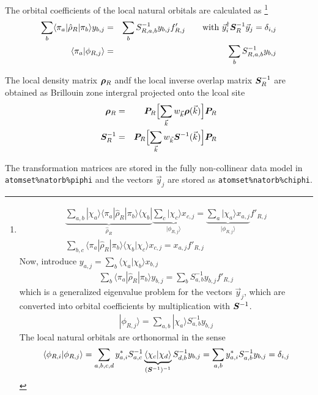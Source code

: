 \documentclass[11pt,a4paper]{report}
\begin{document}
\begin{enumerate}
The orbital coefficients of the local natural orbitals are calculated as
\footnote{
\begin{eqnarray}
\underbrace{\sum_{a,b}|\chi_a\rangle\langle\pi_a|\hat{\rho}_R|\pi_b\rangle
\langle\chi_b|}_{\hat{\rho}_R}
\underbrace{\sum_c|\chi_c\rangle x_{c,j}}_{|\phi_{R,j}\rangle}
=\underbrace{\sum_a|\chi_a\rangle x_{a,j}}_{|\phi_{R,j}\rangle} f'_{R,j}
\nonumber\\
\sum_{b,c}\langle\pi_a|\hat{\rho}_R|\pi_b\rangle
\langle\chi_b|\chi_c\rangle x_{c,j}
=x_{a,j}f'_{R,j}
\end{eqnarray}
Now, introduce $y_{a,j}=\sum_b\langle\chi_a|\chi_b\rangle x_{b,j}$
\begin{eqnarray}
\sum_{b}\langle\pi_a|\hat{\rho}_R|\pi_b\rangle y_{b,j}
=\sum_b S^{-1}_{a,b}y_{b,j}f'_{R,j}
\end{eqnarray}
which is a generalized eigenvalue problem for the vectors $\vec{y}_j$,
which are converted into orbital coefficients by multiplication with
$\bm{S}^{-1}$.
\begin{eqnarray}
|\phi_{R,j}\rangle=\sum_{a,b}|\chi_a\rangle S^{-1}_{a,b} y_{b,j}
\end{eqnarray}
The local natural orbitals are orthonormal in the sense
\begin{eqnarray}
\langle\phi_{R,i}|\phi_{R,j}\rangle
=\sum_{a,b,c,d}
y^*_{a,i}S^{-1}_{a,c}
\underbrace{\langle\chi_c|\chi_d\rangle}_{(\bm{S}^{-1})^{-1}}
 S^{-1}_{d,b} y_{b,j}
=\sum_{a,b}y^*_{a,i}S^{-1}_{a,b}y_{b,j}=\delta_{i,j}
\end{eqnarray}
}
\begin{eqnarray}
\sum_{b}\langle\pi_a|\hat{\rho}_R|\pi_b\rangle y_{b,j}
&=&\sum_b S^{-1}_{R,a,b}y_{b,j}f'_{R,j}
\qquad\text{with $\vec{y}^\dagger_i \bm{S}^{-1}_R\vec{y}_{j}=\delta_{i,j}$}
\\
\langle\pi_a|\phi_{R,j}\rangle&=&\sum_{b} S^{-1}_{R,a,b} y_{b,j}
\end{eqnarray}

The local density matrix $\bm{\rho}_R$ andf the local inverse overlap
matrix $\bm{S}^{-1}_R$ are obtained as Brillouin zone intergral
projected onto the lcoal site
\begin{eqnarray}
\bm{\rho}_R&=&\bm{P}_R\Bigl[
\sum_{\vec{k}} w_{\vec{k}}\bm{\rho}(\vec{k})
\Bigr]\bm{P}_R
\nonumber\\
\bm{S}^{-1}_R&=&\bm{P}_R\Bigl[
\sum_{\vec{k}} w_{\vec{k}}\bm{S}^{-1}(\vec{k})
\Bigr]\bm{P}_R
\end{eqnarray}

The transformation matrices are stored in the fully non-collinear data
model in \verb|atomset%natorb%piphi| and the vectors $\vec{y}_j$ are
stored as \verb|atomset%natorb%chiphi|.


\end{enumerate}
\end{document}
